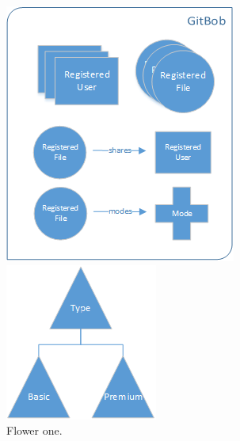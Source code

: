 \documentclass[paper=a4, fontsize=11pt]{scrartcl} %
\numberwithin{equation}{section} %
\numberwithin{figure}{section} %
\numberwithin{table}{section} %
\begin{document}
\begin{figure}[h]
  \centering
  \begin{minipage}[b]{0.35\textwidth}
    \includegraphics[width=\textwidth]{sig_gitbob.png}
    \caption{Flower one.}
  \end{minipage}
  \hfill
  \begin{minipage}[b]{0.2\textwidth}
    \includegraphics[width=\textwidth]{sig_types.png}

\end{minipage}
\end{figure}
\end{document}
